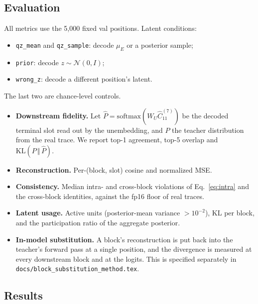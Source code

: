 \documentclass[11pt]{article}
\newcommand{\KL}{\mathrm{KL}}
\newcommand{\N}{\mathcal{N}}
\begin{document}
\subsection{Evaluation}
\label{sec:vae-eval}

All metrics use the 5{,}000 fixed val positions. Latent conditions:
\begin{itemize}[leftmargin=1.5em]
  \item \texttt{qz\_mean} and \texttt{qz\_sample}: decode $\mu_E$ or a posterior sample;
  \item \texttt{prior}: decode $z\sim\N(0,I)$;
  \item \texttt{wrong\_z}: decode a different position's latent.
\end{itemize}
The last two are chance-level controls.

\begin{itemize}[leftmargin=1.5em]
  \item \textbf{Downstream fidelity.} Let $\hat P = \mathrm{softmax}(W_U \hat C_{11}^{(7)})$ be the decoded terminal slot read
    out by the unembedding, and $P$ the teacher distribution from the real trace. We report top-1 agreement, top-5 overlap and
    $\KL(P\,\Vert\,\hat P)$.
  \item \textbf{Reconstruction.} Per-(block, slot) cosine and normalized MSE.
  \item \textbf{Consistency.} Median intra- and cross-block violations of Eq.~\eqref{eq:intra} and the cross-block identities,
    against the fp16 floor of real traces.
  \item \textbf{Latent usage.} Active units (posterior-mean variance $> 10^{-2}$), KL per block, and the participation ratio of the
    aggregate posterior.
  \item \textbf{In-model substitution.} A block's reconstruction is put back into the teacher's forward pass at a single
    position, and the divergence is measured at every downstream block and at the logits. This is specified separately in
    \texttt{docs/block\_substitution\_method.tex}.
\end{itemize}

\subsection{Results}
\end{document}
